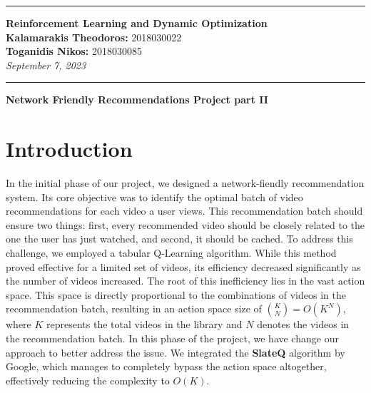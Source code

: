 \documentclass[12pt]{article}
\begin{document}
\noindent\rule{\textwidth}{2pt}
\begin{center}
\large
{\bf Reinforcement Learning and Dynamic Optimization}\\ 
\normalsize
{\bf Kalamarakis Theodoros:} 2018030022\\
{\bf Toganidis Nikos:} 2018030085\\
{\it September 7, 2023}\\
\end{center}
\rule{\textwidth}{.5pt}
\noindent


\justifying

   \begin{center}
       \vspace*{0.5cm}
           
       \LARGE
       \textbf{Network Friendly Recommendations Project part II}
         
   \end{center}

\section*{{\bf Introduction}}
In the initial phase of our project, we designed a network-fiendly recommendation system. Its core objective was to identify the optimal batch of video recommendations 
for each video a user views. This recommendation batch should ensure two things: first, every recommended video should be closely related to the one the user has just watched,
 and second, it should be cached. To address this challenge, we employed a tabular Q-Learning algorithm. While this method proved effective for a limited set of videos,
  its efficiency decreased significantly as the number of videos increased. The root of this inefficiency lies in the vast action space. This space is directly proportional to the combinations 
  of videos in the recommendation batch, resulting in an action space size of ${K \choose N}=O(K^N)$, where $K$ represents the total videos in the library and $N$ denotes the videos in the recommendation batch. 
  In this phase of the project, we have change our approach to better address the issue. We integrated the {\bf SlateQ} algorithm by Google, which manages to completely bypass the action space altogether, 
  effectively reducing the complexity to $O(K)$.
\end{document}
